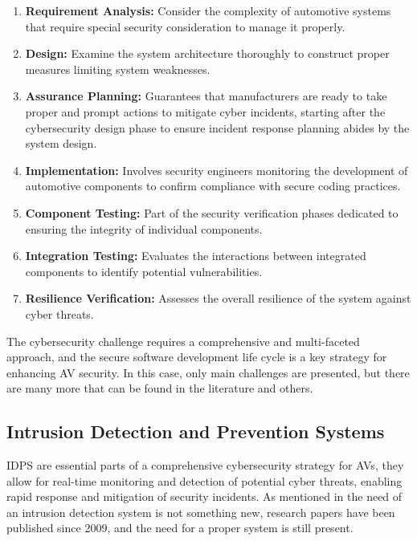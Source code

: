 \begin{enumerate}
    \item \textbf{Requirement Analysis:} Consider the complexity of automotive systems that require special security consideration to manage it properly.
    \item \textbf{Design:} Examine the system architecture thoroughly to construct proper measures limiting system weaknesses.
    \item \textbf{Assurance Planning:} Guarantees that manufacturers are ready to take proper and prompt actions to mitigate cyber incidents, starting after the cybersecurity design phase to ensure incident response planning abides by the system design.
    \item \textbf{Implementation:} Involves security engineers monitoring the development of automotive components to confirm compliance with secure coding practices.
    \item \textbf{Component Testing:} Part of the security verification phases dedicated to ensuring the integrity of individual components.
    \item \textbf{Integration Testing:} Evaluates the interactions between integrated components to identify potential vulnerabilities.
    \item \textbf{Resilience Verification:} Assesses the overall resilience of the system against cyber threats.
\end{enumerate}

The cybersecurity challenge requires a comprehensive and multi-faceted approach, and the secure software development life cycle is a key strategy for enhancing AV security.
In this case, only main challenges are presented, but there are many more that can be found in the literature\cite{moukahal2021towards} and others.

\subsection{Intrusion Detection and Prevention Systems}\label{subsec:intrusion-detection-and-prevention-systems}
IDPS are essential parts of a comprehensive cybersecurity strategy for AVs, they allow for real-time monitoring and detection of potential cyber threats, enabling rapid response and mitigation of security incidents.
As mentioned in\cite{kim2020cybersecurity} the need of an intrusion detection system is not something new, research papers have been published since 2009, and the need for a proper system is still present.

